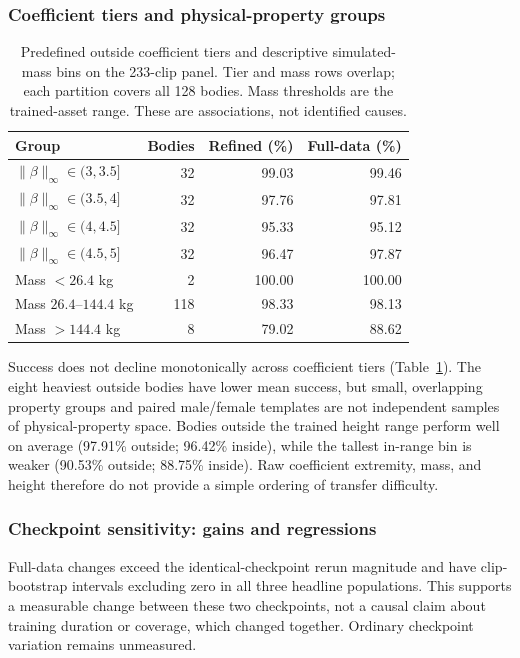 \documentclass[11pt]{article}
\begin{document}
\subsubsection{Coefficient tiers and physical-property groups}
\begin{table}[t]
\centering\small
\caption{Predefined outside coefficient tiers and descriptive simulated-mass
bins on the 233-clip panel. Tier and mass rows overlap; each partition covers
all 128 bodies. Mass thresholds are the trained-asset range. These are
associations, not identified causes.}\label{tab:unseen_v2_groups}
\begin{tabular}{lrrr}
\toprule
Group & Bodies & Refined (\%) & Full-data (\%) \\
\midrule
$\|\beta\|_\infty\in(3,3.5]$ & 32 & 99.03 & 99.46 \\
$\|\beta\|_\infty\in(3.5,4]$ & 32 & 97.76 & 97.81 \\
$\|\beta\|_\infty\in(4,4.5]$ & 32 & 95.33 & 95.12 \\
$\|\beta\|_\infty\in(4.5,5]$ & 32 & 96.47 & 97.87 \\
\midrule
Mass $<26.4$ kg & 2 & 100.00 & 100.00 \\
Mass $26.4$--$144.4$ kg & 118 & 98.33 & 98.13 \\
Mass $>144.4$ kg & 8 & 79.02 & 88.62 \\
\bottomrule
\end{tabular}
\end{table}
Success does not decline monotonically across coefficient tiers
(Table~\ref{tab:unseen_v2_groups}). The eight heaviest outside bodies have
lower mean success, but small, overlapping property groups and paired
male/female templates are not independent samples of physical-property
space. Bodies outside the trained height range perform well on average
(97.91\% outside; 96.42\% inside), while the tallest in-range bin is weaker
(90.53\% outside; 88.75\% inside). Raw coefficient extremity, mass, and
height therefore do not provide a simple ordering of transfer difficulty.

\subsubsection{Checkpoint sensitivity: gains and regressions}
Full-data changes exceed the identical-checkpoint rerun magnitude and have
clip-bootstrap intervals excluding zero in all three headline populations.
This supports a measurable change between these two checkpoints, not a
causal claim about training duration or coverage, which changed together.
Ordinary checkpoint variation remains unmeasured.
\end{document}
